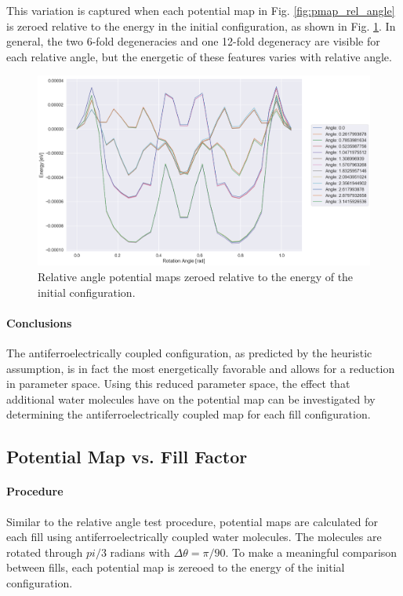         This variation is captured when each potential map in Fig. \ref{fig:pmap_rel_angle} is zeroed relative to the energy in the initial configuration, as shown in Fig. \ref{fig:zeroed_relative_angle_pmap}. In general, the two 6-fold degeneracies and one 12-fold degeneracy are visible for each relative angle, but the energetic of these features varies with relative angle. 
        
        \begin{figure}
            \centering
            \includegraphics[width=0.9\linewidth]{Figures/System/pmap_zeroed_relative_angle.png}
            \caption{Relative angle potential maps zeroed relative to the energy of the initial configuration.}
            \label{fig:zeroed_relative_angle_pmap}
        \end{figure}
        
        \paragraph{Conclusions} The antiferroelectrically coupled configuration, as predicted by the heuristic assumption, is in fact the most energetically favorable and allows for a reduction in parameter space. Using this reduced parameter space, the effect that additional water molecules have on the potential map can be investigated by determining the antiferroelectrically coupled map for each fill configuration.
        
        \subsection{Potential Map vs. Fill Factor}
        \label{sec:map_v_fill}
        
        \paragraph{Procedure} Similar to the relative angle test procedure, potential maps are calculated for each fill using antiferroelectrically coupled water molecules. The molecules are rotated through $pi/3$ radians with $\Delta \theta = \pi/90$. To make a meaningful comparison between fills, each potential map is zereoed to the energy of the initial configuration.
        

